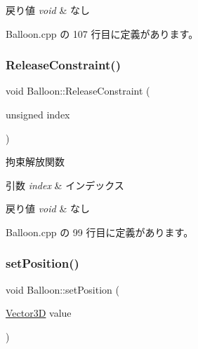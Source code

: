 \begin{DoxyRetVals}{戻り値}
{\em void} & なし \\
\hline
\end{DoxyRetVals}


 Balloon.\+cpp の 107 行目に定義があります。

\mbox{\label{class_balloon_ab7ec0e99baf0b4184b398e98a41d9f48}} 
\subsubsection{\texorpdfstring{Release\+Constraint()}{ReleaseConstraint()}}
{\footnotesize\ttfamily void Balloon\+::\+Release\+Constraint (\begin{DoxyParamCaption}\item[{unsigned}]{index }\end{DoxyParamCaption})}



拘束解放関数 


\begin{DoxyParams}{引数}
{\em index} & インデックス \\
\hline
\end{DoxyParams}

\begin{DoxyRetVals}{戻り値}
{\em void} & なし \\
\hline
\end{DoxyRetVals}


 Balloon.\+cpp の 99 行目に定義があります。

\mbox{\label{class_balloon_a49a709cca0e96d1f00c8f88cd0d98d2f}} 
\subsubsection{\texorpdfstring{set\+Position()}{setPosition()}}
{\footnotesize\ttfamily void Balloon\+::set\+Position (\begin{DoxyParamCaption}\item[{\mbox{\hyperlink{class_vector3_d}{Vector3D}}}]{value }\end{DoxyParamCaption})}



